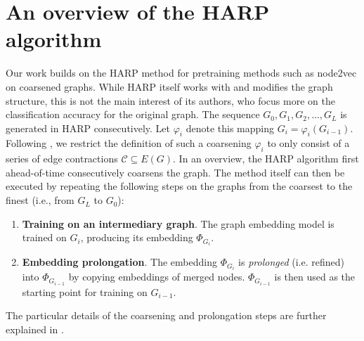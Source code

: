 \section{An overview of the HARP algorithm}\label{sec:harp}

Our work builds on the HARP method \cite{chen_harp_2018} for pretraining methods such as node2vec \cite{grover_node2vec_2016} on coarsened graphs. While HARP itself works with and modifies the graph structure, this is not the main interest of its authors, who focus more on the classification accuracy for the original graph. The sequence \( G_0, G_1, G_2, \dots, G_L \) is generated in HARP consecutively. Let \( \varphi_i \) denote this mapping \( G_i = \varphi_i \left( G_{i - 1} \right) \). Following \cite{schulz_mining_2019}, we restrict the definition of such a coarsening \( \varphi_i \) to only consist of a series of edge contractions \( \mathcal{C} \subseteq E \left( G \right) \). In an overview, the HARP algorithm first ahead-of-time consecutively coarsens the graph. The method itself can then be executed by repeating the following steps on the graphs from the coarsest to the finest (i.e., from \( G_L \) to \( G_0 \)):
\begin{enumerate}
  \item \textbf{Training on an intermediary graph}. The graph embedding model is trained on \( G_i \), producing its embedding \( \Phi_{G_i} \).
  \item \textbf{Embedding prolongation}. The embedding \( \Phi_{G_i} \) is \textit{prolonged} (i.e. refined) into \( \Phi_{G_{i - 1}} \) by copying embeddings of merged nodes. \( \Phi_{G_{i - 1}} \) is then used as the starting point for training on \( G_{i - 1} \).
\end{enumerate}
The particular details of the coarsening and prolongation steps are further explained in \cite{chen_harp_2018}.
